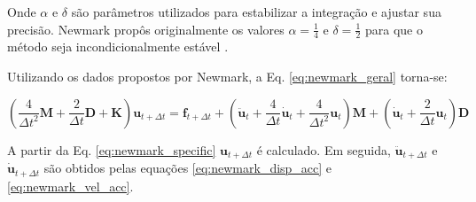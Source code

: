 Onde $\alpha$ e $\delta$ são parâmetros utilizados para estabilizar a integração e ajustar sua precisão. Newmark propôs originalmente os valores $\alpha = \frac{1}{4}$ e $\delta = \frac{1}{2}$ para que o método seja incondicionalmente estável \cite{bathe2006finite}.

Utilizando os dados propostos por Newmark, a Eq. \ref{eq:newmark_geral} torna-se:

\begin{equation}\label{eq:newmark_specific}
\left(\frac{4}{\Delta t^{2}}\pmb{M} + \frac{2}{\Delta t} \pmb{D} + \pmb{K}\right) \pmb{u}_{t + \Delta t} = \pmb{f}_{t + \Delta t} + \left(\ddot{\pmb{u}}_{t} + \frac{4}{\Delta t}\dot{\pmb{u}}_{t} + \frac{4}{\Delta t^{2}}\pmb{u}_{t}\right)\pmb{M} + \left(\dot{\pmb{u}}_{t} + \frac{2}{\Delta t}\pmb{u}_{t}\right)\pmb{D}
\end{equation}

 A partir da Eq. \ref{eq:newmark_specific} $\pmb{u}_{t + \Delta t}$ é calculado. Em seguida, $\ddot{\pmb{u}}_{t + \Delta t}$ e $\dot{\pmb{u}}_{t + \Delta t}$ são obtidos pelas equações \ref{eq:newmark_disp_acc} e \ref{eq:newmark_vel_acc}.
 
